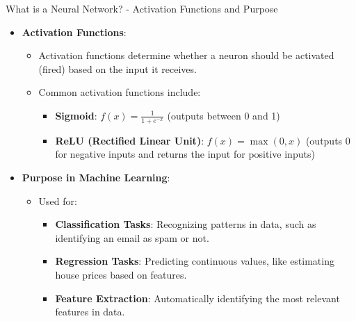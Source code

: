 \documentclass[aspectratio=169]{beamer}
\begin{document}
\begin{frame}[fragile]{What is a Neural Network? - Activation Functions and Purpose}
    \begin{itemize}
        \item \textbf{Activation Functions}:
        \begin{itemize}
            \item Activation functions determine whether a neuron should be activated (fired) based on the input it receives.
            \item Common activation functions include:
            \begin{itemize}
                \item \textbf{Sigmoid}: \( f(x) = \frac{1}{1 + e^{-x}} \) (outputs between 0 and 1)
                \item \textbf{ReLU (Rectified Linear Unit)}: \( f(x) = \max(0, x) \) (outputs 0 for negative inputs and returns the input for positive inputs)
            \end{itemize}
        \end{itemize}
        
        \item \textbf{Purpose in Machine Learning}:
        \begin{itemize}
            \item Used for:
            \begin{itemize}
                \item \textbf{Classification Tasks}: Recognizing patterns in data, such as identifying an email as spam or not.
                \item \textbf{Regression Tasks}: Predicting continuous values, like estimating house prices based on features.
                \item \textbf{Feature Extraction}: Automatically identifying the most relevant features in data.
            \end{itemize}
        \end{itemize}
    \end{itemize}
\end{frame}
\end{document}
